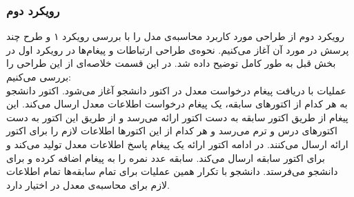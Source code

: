 \subsubsection{رویکرد دوم}
رویکرد دوم از طراحی مورد کاربرد محاسبه‌ی مدل را با بررسی رویکرد ۱ و طرح چند پرسش در مورد آن آغاز می‌کنیم. نحوه‌ی طراحی ارتباطات و پیغام‌ها در رویکرد اول در بخش قبل به طور کامل توضیح داده شد. در این قسمت خلاصه‌ای از این طراحی را بررسی می‌کنیم:\\
عملیات با دریافت پیغام درخواست معدل  در اکتور دانشجو آغاز می‌شود. اکتور دانشجو به هر کدام از اکتورهای سابقه، یک پیغام درخواست اطلاعات معدل  ارسال می‌کند. این پیغام از طریق اکتور سابقه به دست اکتور ارائه می‌رسد و از طریق این اکتور به دست اکتورهای درس و ترم می‌رسد و هر کدام از این اکتورها اطلاعات لازم را برای اکتور ارائه ارسال می‌کنند. در ادامه اکتور ارائه یک پیغام پاسخ اطلاعات معدل   تولید می‌کند و برای اکتور سابقه ارسال می‌کند. سابقه عدد نمره را به پیغام اضافه کرده و برای دانشجو می‌فرستد. دانشجو با تکرار همین عملیات برای تمام سابقه‌ها تمام اطلاعات لازم برای محاسبه‌ی معدل در اختیار دارد.\\
